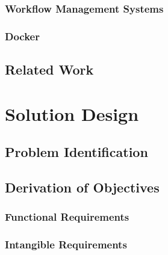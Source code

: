 \documentclass[language=english,noinputenc]{wiwwuwordrprt}
\begin{document}
      \subsection{Workflow Management Systems} %
      \label{sub:workflow_management_systems}
      

      \subsection{Docker} %
      \label{sub:docker}
      
      

    \section{Related Work} %
    \label{sec:related_work}
    
  

  \chapter{Solution Design} %
  \label{cha:solution_design}

    \section{Problem Identification} %
    \label{sec:problem_identification}
    

    \section{Derivation of Objectives} %
    \label{sec:derivation_of_objectives}

      \subsection{Functional Requirements} %
      \label{sub:functional_requirements}
      

      \subsection{Intangible Requirements} %
      \label{sub:intangible_requirements}
      
\end{document}
